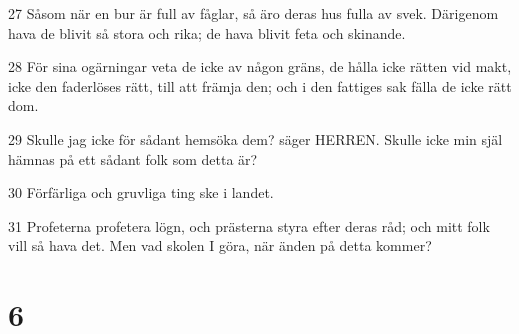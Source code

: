 \par 27 Såsom när en bur är full av fåglar, så äro deras hus fulla av svek. Därigenom hava de blivit så stora och rika; de hava blivit feta och skinande.
\par 28 För sina ogärningar veta de icke av någon gräns, de hålla icke rätten vid makt, icke den faderlöses rätt, till att främja den; och i den fattiges sak fälla de icke rätt dom.
\par 29 Skulle jag icke för sådant hemsöka dem? säger HERREN. Skulle icke min själ hämnas på ett sådant folk som detta är?
\par 30 Förfärliga och gruvliga ting ske i landet.
\par 31 Profeterna profetera lögn, och prästerna styra efter deras råd; och mitt folk vill så hava det. Men vad skolen I göra, när änden på detta kommer?

\chapter{6}

